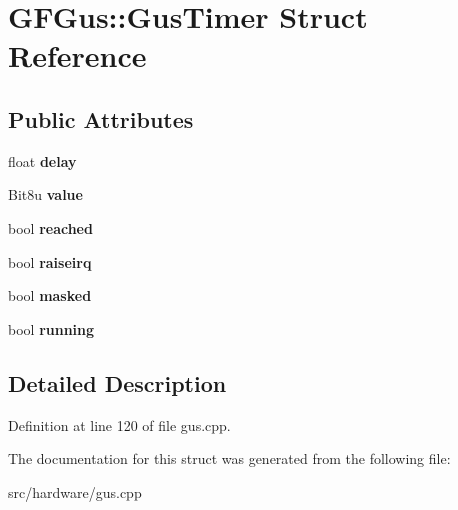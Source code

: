 \hypertarget{structGFGus_1_1GusTimer}{\section{G\-F\-Gus\-:\-:Gus\-Timer Struct Reference}
\label{structGFGus_1_1GusTimer}
}
\subsection*{Public Attributes}
\begin{DoxyCompactItemize}
\item 
\hypertarget{structGFGus_1_1GusTimer_aee952ea33d779a230a2652b5b7a0cac8}{float {\bfseries delay}}\label{structGFGus_1_1GusTimer_aee952ea33d779a230a2652b5b7a0cac8}

\item 
\hypertarget{structGFGus_1_1GusTimer_a31a1f93f014d45aef3fd61d0d5667481}{Bit8u {\bfseries value}}\label{structGFGus_1_1GusTimer_a31a1f93f014d45aef3fd61d0d5667481}

\item 
\hypertarget{structGFGus_1_1GusTimer_aef9e1ea5deb2d585b7f15eb62a89de85}{bool {\bfseries reached}}\label{structGFGus_1_1GusTimer_aef9e1ea5deb2d585b7f15eb62a89de85}

\item 
\hypertarget{structGFGus_1_1GusTimer_a4425a248a4b43b178b279f5a3e8a169c}{bool {\bfseries raiseirq}}\label{structGFGus_1_1GusTimer_a4425a248a4b43b178b279f5a3e8a169c}

\item 
\hypertarget{structGFGus_1_1GusTimer_ac033ff5008998588554e9319437e68a0}{bool {\bfseries masked}}\label{structGFGus_1_1GusTimer_ac033ff5008998588554e9319437e68a0}

\item 
\hypertarget{structGFGus_1_1GusTimer_a0cb384d64010c79f0a588b0ec81968e6}{bool {\bfseries running}}\label{structGFGus_1_1GusTimer_a0cb384d64010c79f0a588b0ec81968e6}

\end{DoxyCompactItemize}


\subsection{Detailed Description}


Definition at line 120 of file gus.\-cpp.



The documentation for this struct was generated from the following file\-:\begin{DoxyCompactItemize}
\item 
src/hardware/gus.\-cpp\end{DoxyCompactItemize}
